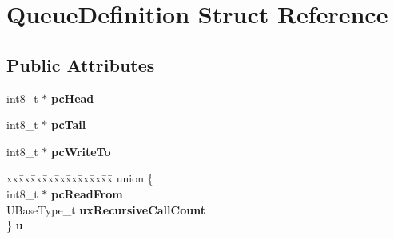 \hypertarget{structQueueDefinition}{}\section{Queue\+Definition Struct Reference}
\label{structQueueDefinition}
\subsection*{Public Attributes}
\begin{DoxyCompactItemize}
\item 
\mbox{\label{structQueueDefinition_a487dc7e43b380c58212cba72bc33e0ed}} 
int8\+\_\+t $\ast$ {\bfseries pc\+Head}
\item 
\mbox{\label{structQueueDefinition_a189dc1b16fc2152dd9441ea1a117b0ce}} 
int8\+\_\+t $\ast$ {\bfseries pc\+Tail}
\item 
\mbox{\label{structQueueDefinition_abdf13cc013c8488848cee3fce4f0fed3}} 
int8\+\_\+t $\ast$ {\bfseries pc\+Write\+To}
\item 
\mbox{\label{structQueueDefinition_aefb54cb1972fb4173125060081828553}} 
\begin{tabbing}
xx\=xx\=xx\=xx\=xx\=xx\=xx\=xx\=xx\=\kill
union \{\\
\>int8\_t $\ast$ {\bfseries pcReadFrom}\\
\>UBaseType\_t {\bfseries uxRecursiveCallCount}\\
\} {\bfseries u}\\


\end{tabbing}
\end{DoxyCompactItemize}
